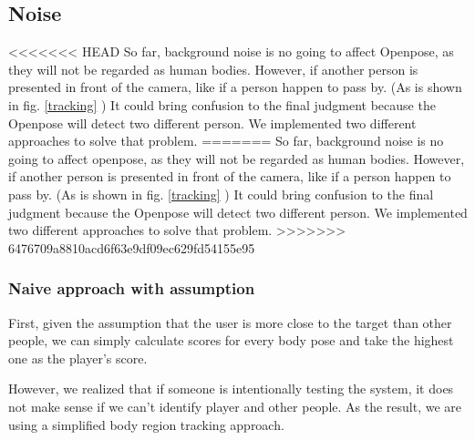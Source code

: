 \documentclass[11pt,twocolumn,letterpaper]{article}
\begin{document}
	\subsection{Noise}
\par
<<<<<<< HEAD
So far, background noise is no going to affect Openpose, as they will not be regarded as human bodies. However, if another person is presented in front of the camera, like if a person happen to pass by. (As is shown in fig. \ref{tracking} ) It could bring confusion to the final judgment because the Openpose will detect two different person. We implemented two different approaches to solve that problem.
=======
So far, background noise is no going to affect openpose, as they will not be regarded as human bodies. However, if another person is presented in front of the camera, like if a person happen to pass by. (As is shown in fig. \ref{tracking} ) It could bring confusion to the final judgment because the Openpose will detect two different person. We implemented two different approaches to solve that problem.
>>>>>>> 6476709a8810acd6f63e9df09ec629fd54155e95
\subsubsection {Naive approach with assumption}
\par
First, given the assumption that the user is more close to the target than other people, we can simply calculate scores for every body pose and take the highest one as the player's score.
\par
However, we realized that if someone is intentionally testing the system, it does not make sense if we can't identify player and other people. As the result, we are using a simplified body region tracking approach.
\end{document}
